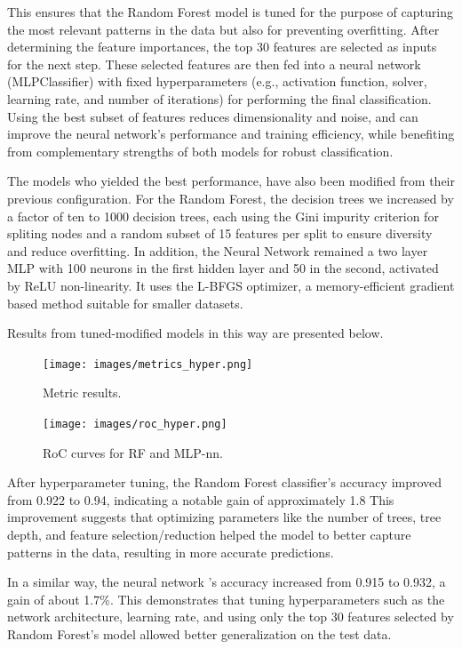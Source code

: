 \documentclass[11pt,a4paper]{article}
\begin{document}
		This ensures that the Random Forest model is tuned for the purpose of capturing
		the most relevant patterns in the data but also for preventing overfitting. 
		After determining the feature importances, the top 30 features are selected as inputs for the next step.
		These selected features are then fed into a neural network (MLPClassifier) 
		with fixed hyperparameters (e.g., activation function, solver, learning rate, and number of iterations) for
		performing the final classification. 
		Using the best subset of features reduces dimensionality and noise, and can improve the 
		neural network’s performance and training efficiency, 
		while benefiting from complementary strengths of both models for robust classification.
	

		The models who yielded the best performance, 
		have also been modified from their previous configuration.
		For the Random Forest, the decision trees we increased by a factor of ten to 1000 decision trees, 
		each using the Gini impurity criterion for spliting  nodes and a random subset of 15 features per split
		to ensure diversity and reduce overfitting. 
		In addition, the Neural Network remained a two layer MLP with 100 neurons in the first hidden layer and 
		50 in the second, activated by ReLU non-linearity. 
		It uses the L-BFGS optimizer, a memory-efficient gradient based method 
		suitable for smaller datasets. 


		Results from tuned-modified models in this way are presented below.


		\begin{figure}[H]
			\centering
			\texttt{[image: images/metrics\_hyper.png]}
			\caption{Metric results.}
			\label{fig1:}
		\end{figure}		

		\begin{figure}[H]
			\centering
			\texttt{[image: images/roc\_hyper.png]}
			\caption{RoC curves for RF and MLP-nn.}
			\label{fig1:}
		\end{figure}		

	
		After hyperparameter tuning, the Random Forest classifier’s accuracy improved from 0.922 to 0.94, 
		indicating a notable gain of approximately 1.8%
		This improvement suggests that optimizing 
		parameters like the number of trees, tree depth, and feature selection/reduction helped the model to
		better capture patterns in the data, resulting in more accurate predictions.

		In a similar way, the neural network 's accuracy increased from 0.915 to 0.932, 
		a gain of about 1.7\%. 
		This demonstrates that tuning hyperparameters such as the network architecture, 
		learning rate, and using only the top 30 features selected by Random Forest's model
		allowed  better generalization on the test data.
\end{document}
